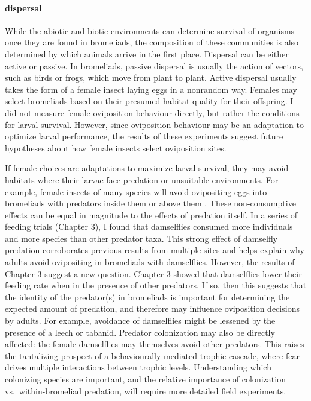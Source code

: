 \paragraph{dispersal}\label{dispersal}

While the abiotic and biotic environments can determine survival of
organisms once they are found in bromeliads, the composition of these
communities is also determined by which animals arrive in the first
place. Dispersal can be either active or passive. In bromeliads, passive
dispersal is usually the action of vectors, such as birds or frogs,
which move from plant to plant. Active dispersal usually takes the form
of a female insect laying eggs in a nonrandom way. Females may select
bromeliads based on their presumed habitat quality for their offspring.
I did not measure female oviposition behaviour directly, but rather the
conditions for larval survival. However, since oviposition behaviour may
be an adaptation to optimize larval performance, the results of these
experiments suggest future hypotheses about how female insects select
oviposition sites.

If female choices are adaptations to maximize larval survival, they may
avoid habitats where their larvae face predation or unsuitable
environments. For example, female insects of many species will avoid
ovipositing eggs into bromeliads with predators inside them
\citep{hammill} or above them \citep{romero&srivastava}. These
non-consumptive effects can be equal in magnitude to the effects of
predation itself. In a series of feeding trials (Chapter 3), I found
that damselflies consumed more individuals and more species than other
predator taxa. This strong effect of damselfly predation corroborates
previous results from multiple sites \citep{ref} and helps explain why
adults avoid ovipositing in bromeliads with damselflies. However, the
results of Chapter 3 suggest a new question. Chapter 3 showed that
damselflies lower their feeding rate when in the presence of other
predators. If so, then this suggests that the identity of the
predator(s) in bromeliads is important for determining the expected
amount of predation, and therefore may influence oviposition decisions
by adults. For example, avoidance of damselflies might be lessened by
the presence of a leech or tabanid. Predator colonization may also be
directly affected: the female damselflies may themselves avoid other
predators. This raises the tantalizing prospect of a
behaviourally-mediated trophic cascade, where fear drives multiple
interactions between trophic levels. Understanding which colonizing
species are important, and the relative importance of colonization
vs.~within-bromeliad predation, will require more detailed field
experiments.

